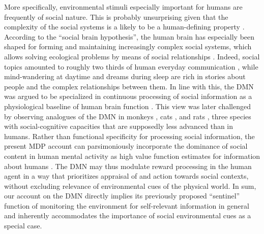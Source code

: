 \documentclass[10pt,letterpaper]{article}
\begin{document}
More specifically,
environmental stimuli especially important for humans are frequently of
social nature. This is probably unsurprising
given that
the complexity of the social systems
is a likely to be a human-defining property
\citep{tomasello2009cultural}.
According to the ``social brain hypothesis'',
the human brain has especially been shaped for
forming and maintaining increasingly complex
social systems,
which allows solving ecological problems by means of social relationships
\citep{whiten1988machiavellian}.
Indeed, social topics amounted to roughly
two thirds of human everyday communication \citep{dunbar1997human},
while
mind-wandering at daytime and dreams during sleep
are rich in stories about people and
the complex relationships between them.
%
In line with this, the DMN was argued to be specialized in
continuous processing of social information as a
physiological baseline of human brain function
\citep{schilbach2008minds}. This view was later challenged by observing
analogues of the DMN in monkeys \citep{mantini2011default},
cats \citep{popa2009contrasting},
and rats \citep{lu2012rat}, three species with
social-cognitive capacities that are supposedly less advanced than in humans.
Rather than functional specificity for processing social information,
the present MDP account can parsimoniously incorporate
the dominance of social content in
human mental activity
as high value function estimates for information about humans
\citep{baker2009action, kampe2001psychology, krienen2010clan}.
The DMN may thus modulate reward processing
in the human agent in a way that prioritizes
appraisal of and action towards social contexts,
without excluding relevance of environmental cues of the physical world.
In sum,
our account on the DMN directly implies
its previously proposed ``sentinel'' function
of monitoring the environment for self-relevant information
in general and
inherently accommodates the importance of social environmental cues
as a special case.
\end{document}

